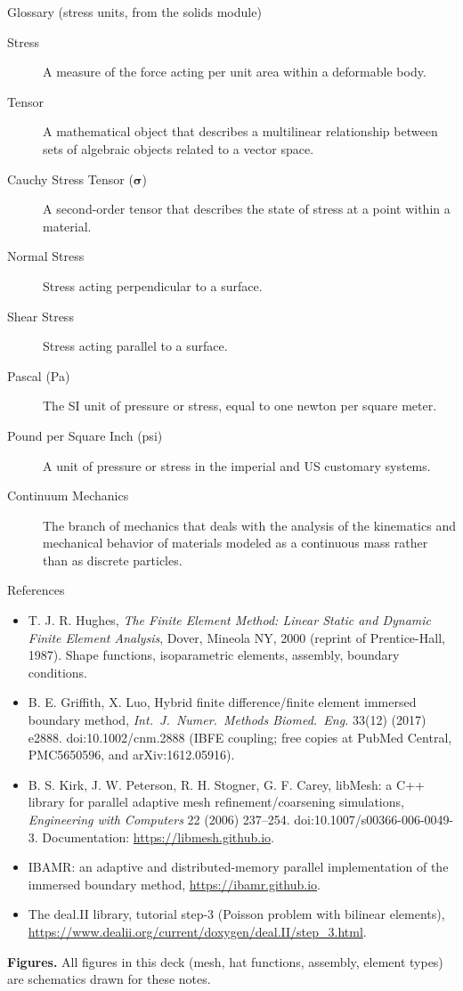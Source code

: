 \documentclass[aspectratio=169,11pt]{beamer}
\begin{document}
\begin{frame}{Glossary (stress units, from the solids module)}
  \begin{description}
    \item[Stress] A measure of the force acting per unit area within a deformable body.
    \item[Tensor] A mathematical object that describes a multilinear relationship between sets of algebraic objects related to a vector space.
    \item[Cauchy Stress Tensor ($\boldsymbol{\sigma}$)] A second-order tensor that describes the state of stress at a point within a material.
    \item[Normal Stress] Stress acting perpendicular to a surface.
    \item[Shear Stress] Stress acting parallel to a surface.
    \item[Pascal (Pa)] The SI unit of pressure or stress, equal to one newton per square meter.
    \item[Pound per Square Inch (psi)] A unit of pressure or stress in the imperial and US customary systems.
    \item[Continuum Mechanics] The branch of mechanics that deals with the analysis of the kinematics and mechanical behavior of materials modeled as a continuous mass rather than as discrete particles.
  \end{description}
\end{frame}

\begin{frame}{References}
  \scriptsize
  \begin{itemize}
    \item T. J. R. Hughes, \emph{The Finite Element Method: Linear Static and Dynamic Finite Element Analysis}, Dover, Mineola NY, 2000 (reprint of Prentice-Hall, 1987). Shape functions, isoparametric elements, assembly, boundary conditions.
    \item B. E. Griffith, X. Luo, Hybrid finite difference/finite element immersed boundary method, \emph{Int.\ J.\ Numer.\ Methods Biomed.\ Eng.} 33(12) (2017) e2888. doi:10.1002/cnm.2888 (IBFE coupling; free copies at PubMed Central, PMC5650596, and arXiv:1612.05916).
    \item B. S. Kirk, J. W. Peterson, R. H. Stogner, G. F. Carey, libMesh: a C++ library for parallel adaptive mesh refinement/coarsening simulations, \emph{Engineering with Computers} 22 (2006) 237--254. doi:10.1007/s00366-006-0049-3. Documentation: \url{https://libmesh.github.io}.
    \item IBAMR: an adaptive and distributed-memory parallel implementation of the immersed boundary method, \url{https://ibamr.github.io}.
    \item The deal.II library, tutorial step-3 (Poisson problem with bilinear elements), \url{https://www.dealii.org/current/doxygen/deal.II/step_3.html}.
  \end{itemize}
  \medskip
  \textbf{Figures.} All figures in this deck (mesh, hat functions, assembly, element types) are schematics drawn for these notes.
\end{frame}
\end{document}

